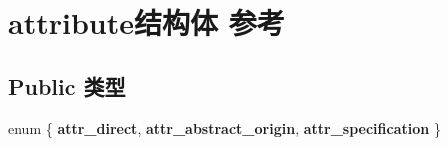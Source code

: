 \hypertarget{structattribute}{}\section{attribute结构体 参考}
\label{structattribute}
\subsection*{Public 类型}
\begin{DoxyCompactItemize}
\item 
\mbox{\label{structattribute_afc8d226fcca34a8b9ba311a97e780ff1}} 
enum \{ {\bfseries attr\+\_\+direct}, 
{\bfseries attr\+\_\+abstract\+\_\+origin}, 
{\bfseries attr\+\_\+specification}
 \}
\end{DoxyCompactItemize}
